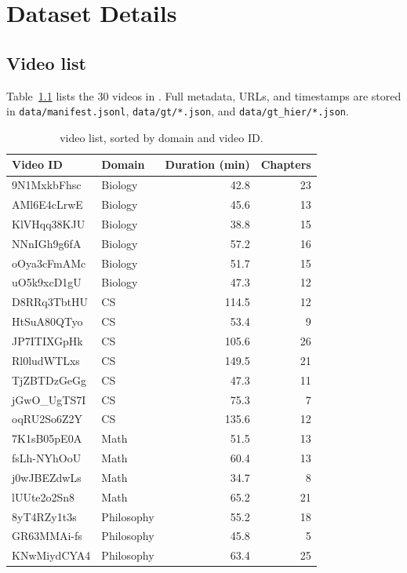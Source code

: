 \chapter{Dataset Details}
\label{app:dataset}

\section{Video list}

\noindent Table~\ref{tab:video_list} lists the 30 videos in \dataset{}.
Full metadata, URLs, and timestamps are stored in
\texttt{data/manifest.jsonl}, \texttt{data/gt/*.json}, and
\texttt{data/gt\_hier/*.json}.

\begin{table}[h]
  \centering
  \caption{\dataset{} video list, sorted by domain and video ID.}
  \label{tab:video_list}
  \scriptsize
  \begin{tabular}{llrr}
    \toprule
    Video ID & Domain & Duration (min) & Chapters \\
    \midrule
    9N1MxkbFhsc & Biology & 42.8 & 23 \\
    AMl6E4cLrwE & Biology & 45.6 & 13 \\
    KlVHqq38KJU & Biology & 38.8 & 15 \\
    NNnIGh9g6fA & Biology & 57.2 & 16 \\
    oOya3cFmAMc & Biology & 51.7 & 15 \\
    uO5k9xcD1gU & Biology & 47.3 & 12 \\
    D8RRq3TbtHU & CS & 114.5 & 12 \\
    HtSuA80QTyo & CS & 53.4 & 9 \\
    JP7ITIXGpHk & CS & 105.6 & 26 \\
    Rl0ludWTLxs & CS & 149.5 & 21 \\
    TjZBTDzGeGg & CS & 47.3 & 11 \\
    jGwO\_UgTS7I & CS & 75.3 & 7 \\
    oqRU2So6Z2Y & CS & 135.6 & 12 \\
    7K1sB05pE0A & Math & 51.5 & 13 \\
    fsLh-NYhOoU & Math & 60.4 & 13 \\
    j0wJBEZdwLs & Math & 34.7 & 8 \\
    lUUte2o2Sn8 & Math & 65.2 & 21 \\
    8yT4RZy1t3s & Philosophy & 55.2 & 18 \\
    GR63MMAi-fs & Philosophy & 45.8 & 5 \\
    KNwMiydCYA4 & Philosophy & 63.4 & 25 \\

\end{tabular}
\end{table}
